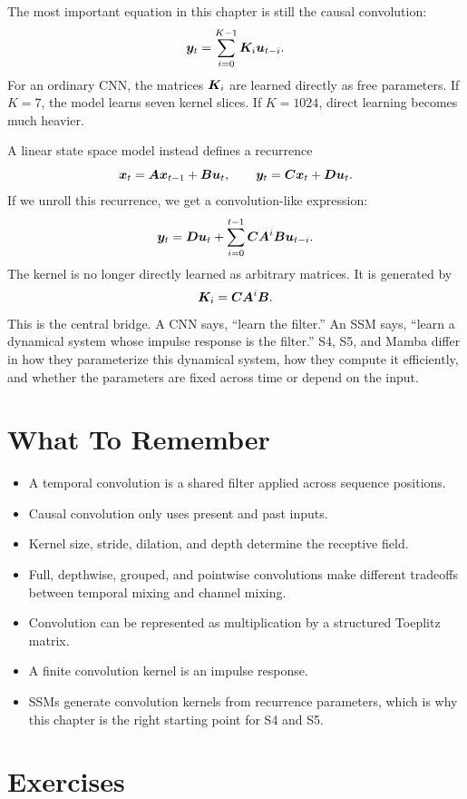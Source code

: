 The most important equation in this chapter is still the causal convolution:
\[
  \bm{y}_t = \sum_{i=0}^{K-1} \bm{K}_i \bm{u}_{t-i}.
\]
For an ordinary CNN, the matrices $\bm{K}_i$ are learned directly as free parameters. If
$K=7$, the model learns seven kernel slices. If $K=1024$, direct learning becomes much
heavier.

A linear state space model instead defines a recurrence
\[
  \bm{x}_t = \bm{A} \bm{x}_{t-1} + \bm{B} \bm{u}_t,
  \qquad
  \bm{y}_t = \bm{C} \bm{x}_t + \bm{D} \bm{u}_t.
\]
If we unroll this recurrence, we get a convolution-like expression:
\[
  \bm{y}_t
  =
  \bm{D}\bm{u}_t
  +
  \sum_{i=0}^{t-1} \bm{C} \bm{A}^i \bm{B} \bm{u}_{t-i}.
\]
The kernel is no longer directly learned as arbitrary matrices. It is generated by
\[
  \bm{K}_i = \bm{C} \bm{A}^i \bm{B}.
\]
This is the central bridge. A CNN says, ``learn the filter.'' An SSM says, ``learn a
dynamical system whose impulse response is the filter.'' S4, S5, and Mamba differ in how
they parameterize this dynamical system, how they compute it efficiently, and whether the
parameters are fixed across time or depend on the input.

\section{What To Remember}

\begin{itemize}
  \item A temporal convolution is a shared filter applied across sequence positions.
  \item Causal convolution only uses present and past inputs.
  \item Kernel size, stride, dilation, and depth determine the receptive field.
  \item Full, depthwise, grouped, and pointwise convolutions make different tradeoffs
  between temporal mixing and channel mixing.
  \item Convolution can be represented as multiplication by a structured Toeplitz matrix.
  \item A finite convolution kernel is an impulse response.
  \item SSMs generate convolution kernels from recurrence parameters, which is why this
  chapter is the right starting point for S4 and S5.
\end{itemize}

\section{Exercises}

